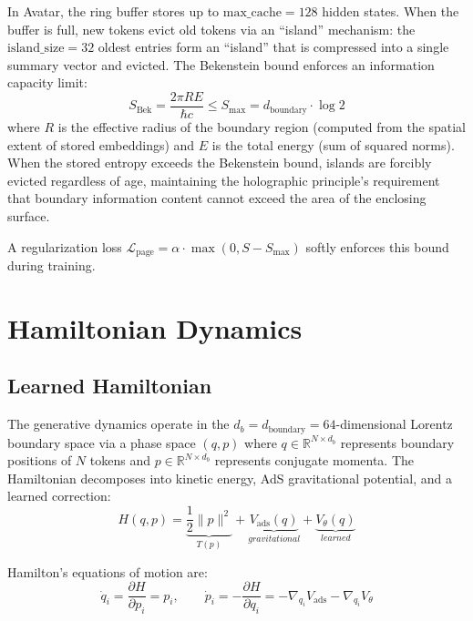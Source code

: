 \documentclass[11pt,a4paper,twocolumn]{article}
\begin{document}
In Avatar, the ring buffer stores up to $\mathrm{max\_cache} = 128$ hidden states.
When the buffer is full, new tokens evict old tokens via an ``island'' mechanism: the $\mathrm{island\_size} = 32$ oldest entries form an ``island'' that is compressed into a single summary vector and evicted.
The Bekenstein bound enforces an information capacity limit:
\begin{equation}
S_{\mathrm{Bek}} = \frac{2\pi R E}{\hbar c} \leq S_{\mathrm{max}} = d_{\mathrm{boundary}} \cdot \log 2
\label{eq:bekenstein}
\end{equation}
where $R$ is the effective radius of the boundary region (computed from the spatial extent of stored embeddings) and $E$ is the total energy (sum of squared norms).
When the stored entropy exceeds the Bekenstein bound, islands are forcibly evicted regardless of age, maintaining the holographic principle's requirement that boundary information content cannot exceed the area of the enclosing surface.

A regularization loss $\mathcal{L}_{\mathrm{page}} = \alpha \cdot \max(0, S - S_{\mathrm{max}})$ softly enforces this bound during training.

\section{Hamiltonian Dynamics}

\subsection{Learned Hamiltonian}

The generative dynamics operate in the $d_b = d_{\mathrm{boundary}} = 64$-dimensional Lorentz boundary space via a phase space $(q, p)$ where $q \in \mathbb{R}^{N \times d_b}$ represents boundary positions of $N$ tokens and $p \in \mathbb{R}^{N \times d_b}$ represents conjugate momenta.
The Hamiltonian decomposes into kinetic energy, AdS gravitational potential, and a learned correction:
\begin{equation}
H(q, p) = \underbrace{\frac{1}{2}\|p\|^2}_{T(p)} + \underbrace{V_{\mathrm{ads}}(q)}_{gravitational} + \underbrace{V_\theta(q)}_{learned}
\label{eq:hamiltonian}
\end{equation}

Hamilton's equations of motion are:
\begin{equation}
\dot{q}_i = \frac{\partial H}{\partial p_i} = p_i, \qquad \dot{p}_i = -\frac{\partial H}{\partial q_i} = -\nabla_{q_i} V_{\mathrm{ads}} - \nabla_{q_i} V_\theta
\label{eq:hamilton_eom}
\end{equation}
\end{document}
